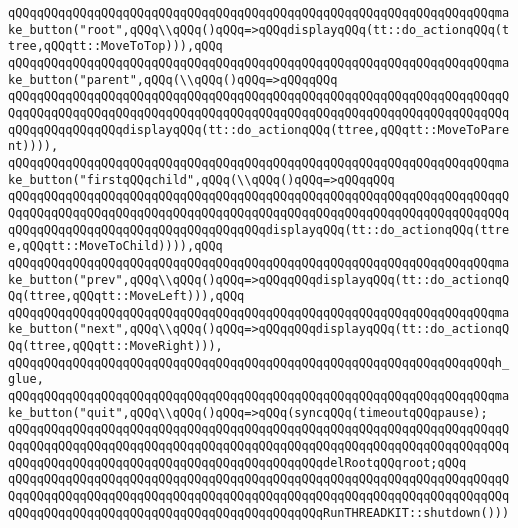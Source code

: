 \verb|qQQqqQQqqQQqqQQqqQQqqQQqqQQqqQQqqQQqqQQqqQQqqQQqqQQqqQQqqQQqqQQqqQQqmake_button("root",qQQq\\qQQq()qQQq=>qQQqdisplayqQQq(tt::do_actionqQQq(ttree,qQQqtt::MoveToTop))),qQQq|\newline
\verb|qQQqqQQqqQQqqQQqqQQqqQQqqQQqqQQqqQQqqQQqqQQqqQQqqQQqqQQqqQQqqQQqqQQqmake_button("parent",qQQq(\\qQQq()qQQq=>qQQqqQQq|\newline
\verb|qQQqqQQqqQQqqQQqqQQqqQQqqQQqqQQqqQQqqQQqqQQqqQQqqQQqqQQqqQQqqQQqqQQqqQQqqQQqqQQqqQQqqQQqqQQqqQQqqQQqqQQqqQQqqQQqqQQqqQQqqQQqqQQqqQQqqQQqqQQqqQQqqQQqqQQqqQQqdisplayqQQq(tt::do_actionqQQq(ttree,qQQqtt::MoveToParent)))),|\newline
\verb|qQQqqQQqqQQqqQQqqQQqqQQqqQQqqQQqqQQqqQQqqQQqqQQqqQQqqQQqqQQqqQQqqQQqmake_button("firstqQQqchild",qQQq(\\qQQq()qQQq=>qQQqqQQq|\newline
\verb|qQQqqQQqqQQqqQQqqQQqqQQqqQQqqQQqqQQqqQQqqQQqqQQqqQQqqQQqqQQqqQQqqQQqqQQqqQQqqQQqqQQqqQQqqQQqqQQqqQQqqQQqqQQqqQQqqQQqqQQqqQQqqQQqqQQqqQQqqQQqqQQqqQQqqQQqqQQqqQQqqQQqqQQqqQQqqQQqdisplayqQQq(tt::do_actionqQQq(ttree,qQQqtt::MoveToChild)))),qQQq|\newline
\verb|qQQqqQQqqQQqqQQqqQQqqQQqqQQqqQQqqQQqqQQqqQQqqQQqqQQqqQQqqQQqqQQqqQQqmake_button("prev",qQQq\\qQQq()qQQq=>qQQqqQQqdisplayqQQq(tt::do_actionqQQq(ttree,qQQqtt::MoveLeft))),qQQq|\newline
\verb|qQQqqQQqqQQqqQQqqQQqqQQqqQQqqQQqqQQqqQQqqQQqqQQqqQQqqQQqqQQqqQQqqQQqmake_button("next",qQQq\\qQQq()qQQq=>qQQqqQQqdisplayqQQq(tt::do_actionqQQq(ttree,qQQqtt::MoveRight))),|\newline
\verb|qQQqqQQqqQQqqQQqqQQqqQQqqQQqqQQqqQQqqQQqqQQqqQQqqQQqqQQqqQQqqQQqqQQqh_glue,|\newline
\verb|qQQqqQQqqQQqqQQqqQQqqQQqqQQqqQQqqQQqqQQqqQQqqQQqqQQqqQQqqQQqqQQqqQQqmake_button("quit",qQQq\\qQQq()qQQq=>qQQq(syncqQQq(timeoutqQQqpause);|\newline
\verb|qQQqqQQqqQQqqQQqqQQqqQQqqQQqqQQqqQQqqQQqqQQqqQQqqQQqqQQqqQQqqQQqqQQqqQQqqQQqqQQqqQQqqQQqqQQqqQQqqQQqqQQqqQQqqQQqqQQqqQQqqQQqqQQqqQQqqQQqqQQqqQQqqQQqqQQqqQQqqQQqqQQqqQQqqQQqqQQqqQQqqQQqdelRootqQQqroot;qQQq|\newline
\verb|qQQqqQQqqQQqqQQqqQQqqQQqqQQqqQQqqQQqqQQqqQQqqQQqqQQqqQQqqQQqqQQqqQQqqQQqqQQqqQQqqQQqqQQqqQQqqQQqqQQqqQQqqQQqqQQqqQQqqQQqqQQqqQQqqQQqqQQqqQQqqQQqqQQqqQQqqQQqqQQqqQQqqQQqqQQqqQQqqQQqqQQqRunTHREADKIT::shutdown()))|\newline
